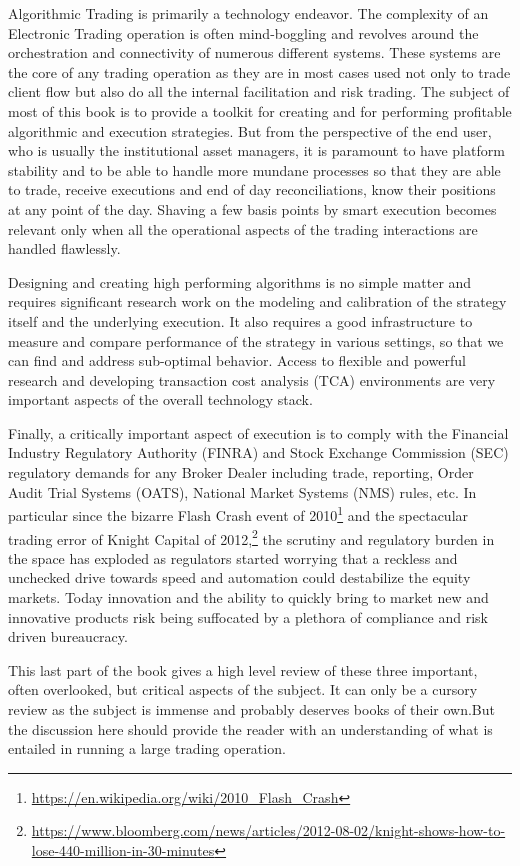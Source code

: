 
Algorithmic Trading is primarily a technology endeavor. The complexity of an Electronic Trading operation is often mind-boggling and revolves around the orchestration and connectivity of numerous different systems. These systems are the core of any trading operation as they are in most cases used not only to trade client flow but also do all the internal facilitation and risk trading. The subject of most of this book is to provide a toolkit for creating and for performing profitable algorithmic and execution strategies. But from the perspective of the end user, who is usually the institutional asset managers, it is paramount to have platform stability and to be able to handle more mundane processes so that they are able to trade, receive executions and end of day reconciliations, know their positions at any point of the day. Shaving a few basis points by smart execution becomes relevant only when all the operational aspects of the trading interactions are handled flawlessly.


Designing and creating high performing algorithms is no simple matter and requires significant research work on the modeling and calibration of the strategy itself and the underlying execution. It also requires a good infrastructure to measure and compare  performance of the strategy in various settings, so that we can find and address sub-optimal behavior. Access to flexible and powerful research and developing transaction cost analysis (TCA) environments are very important aspects of the overall technology stack.


Finally, a critically important aspect of execution is to comply with the Financial Industry Regulatory Authority (FINRA) and Stock Exchange Commission (SEC) regulatory demands for any Broker Dealer including trade, reporting, Order Audit Trial Systems (OATS), National Market Systems (NMS) rules, etc. In particular since the bizarre Flash Crash event of 2010\footnote{\url{https://en.wikipedia.org/wiki/2010_Flash_Crash}} and the spectacular trading error of Knight Capital of 2012,\footnote{\url{https://www.bloomberg.com/news/articles/2012-08-02/knight-shows-how-to-lose-440-million-in-30-minutes}} the scrutiny and regulatory burden in the space has exploded as regulators started worrying that a reckless and unchecked drive towards speed and automation could destabilize the equity markets. Today innovation and the ability to quickly bring to market new and innovative products risk being suffocated by a plethora of compliance and risk driven bureaucracy. 


This last part of the book gives a high level review of these three important, often overlooked, but critical aspects of the subject. It can only be a cursory review as the subject is immense and probably deserves books of their own.But the discussion here should provide the reader with an understanding of what is entailed in running a large trading operation.